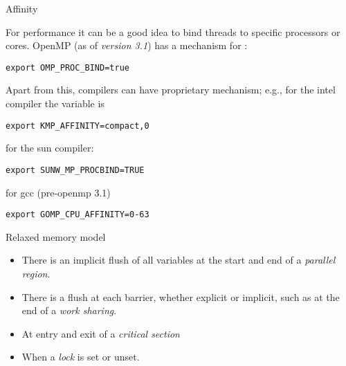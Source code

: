  {Affinity}

For performance it can be a good idea to bind threads to specific
processors or cores.  OpenMP (as of \emph{version 3.1}) has a
mechanism for :
\begin{verbatim}
export OMP_PROC_BIND=true  
\end{verbatim}
Apart from this, compilers can have proprietary mechanism; 
e.g., for the intel compiler the variable is
\begin{verbatim}
export KMP_AFFINITY=compact,0
\end{verbatim}
for the sun compiler:
\begin{verbatim}
export SUNW_MP_PROCBIND=TRUE
\end{verbatim}
for gcc (pre-openmp 3.1)
\begin{verbatim}
export GOMP_CPU_AFFINITY=0-63
\end{verbatim}

 {Relaxed memory model}


\begin{itemize}
\item There is an implicit flush of all variables at the start and end 
  of a \emph{parallel region}.
\item There is a flush at each barrier, whether explicit or implicit,
  such as at the end of a \emph{work sharing}.
\item At entry and exit of a \emph{critical section}
\item When a \emph{lock} is set or unset.
\end{itemize}

